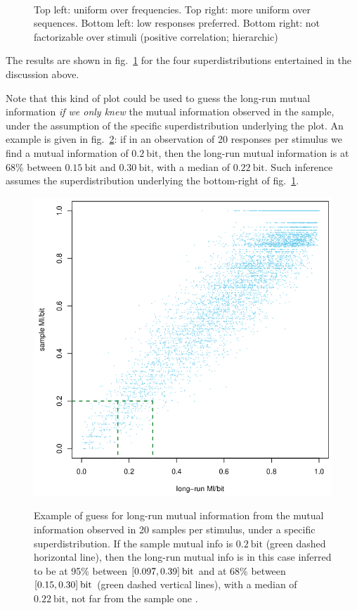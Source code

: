 \documentclass[\ifafour a4paper,12pt,\else a5paper,10pt,\fi%
onecolumn,oneside,article,%
british%
]{memoir}
\theoremstyle{remark}
\theoremstyle{innote}
\DeclarePairedDelimiter\clcl{[}{]}
\renewcommand*{\|}[1][]{\nonscript\,#1\vert\nonscript\;\mathopen{}}
\renewcommand*{\=}{\TextOrMath\texteq\eq}
\newcommand*{\fig}{fig.}%
\newcommand*{\bit}{\mathrm{bit}}
\begin{document}
\begin{figure}[p]
\\%
\caption{Top left: uniform over frequencies. Top right: more uniform over
  sequences. Bottom left: low responses preferred. Bottom right: not
  factorizable over stimuli (positive correlation;
  hierarchic)}\label{fig:superdistributions}
\end{figure}%
The results are shown in \fig~\ref{fig:superdistributions} for the four
superdistributions entertained in the discussion above.

Note that this kind of plot could be used to guess the long-run mutual
information \emph{if we only knew} the mutual information observed in the
sample, under the assumption of the specific superdistribution underlying
the plot. An example is given in \fig~\ref{fig:backward}: if in an
observation of 20 responses per stimulus we find a mutual information of
$0.2\:\bit$, then the long-run mutual information is at 68\% between
$0.15\:\bit$ and $0.30\:\bit$, with a median of $0.22\:\bit$. Such
inference assumes the superdistribution underlying the bottom-right of
\fig~\ref{fig:superdistributions}.
\begin{figure}[bt!]%
\centering\includegraphics[width=\linewidth]{scripts/scatter_backward.png}%
\\%
\caption{Example of guess for long-run mutual information from the mutual
  information observed in 20 samples per stimulus, under a specific
  superdistribution. If the sample mutual info is $0.2\:\bit$ (green dashed
  horizontal line), then the long-run mutual info is in this case inferred
  to be at 95\% between $\clcl{0.097, 0.39}\:\bit$ and at 68\% between
  $\clcl{0.15, 0.30}\:\bit$ (green dashed vertical lines), with a median of
  $0.22\:\bit$, not far from the sample one \parencite[compare with the
  different conclusions in][Fig.~1A]{panzerietal2007}.}\label{fig:backward}
\end{figure}%
\end{document}
